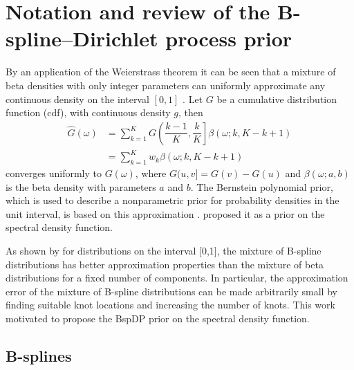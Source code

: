 \documentclass[twocolumn,final]{svjour3}
\begin{document}
\section{Notation and review of the B-spline--Dirichlet process prior}

By an application of the Weierstrass theorem it can be seen that a mixture of beta densities with only integer parameters can uniformly approximate any continuous density  on the interval $[0,1]$ \citep{Choudhuri:2004}.  Let $G$ be a cumulative distribution function (cdf), with continuous density $g$, then 
\begin{align*}
\widehat{G}(\omega) &= \sum_{k=1}^{K} G \left( \dfrac{k-1}{K} , \dfrac{k}{K} \right] \beta(\omega; k, K-k+1)\\
&= \sum_{k=1}^{K} w_k \beta(\omega; k, K-k+1)
\end{align*}	  
converges uniformly to $G(\omega)$, where $G(u,v] = G(v) - G(u)$ and $\beta(\omega; a,b)$ is the beta density with parameters $a$ and $b$.
The Bernstein polynomial prior, which is used to describe a nonparametric prior for probability densities in the unit interval, is based on this approximation \citep{Petrone:1999a,Petrone:199b}.  \cite{Choudhuri:2004} proposed it as a prior on the spectral density function.

As shown by \cite{Perron:2001} for distributions on the interval [0,1], the mixture of B-spline distributions has better approximation properties than the mixture of beta distributions for a fixed number of components. In particular, the approximation error of the mixture of B-spline distributions 
can be made arbitrarily small by finding  suitable knot locations and increasing the number of knots.
This work motivated \cite{Edwards2018} to propose the BspDP prior on the spectral density function.

\subsection*{B-splines}
\end{document}
